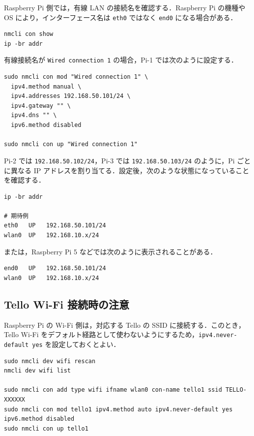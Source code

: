Raspberry Pi 側では，有線 LAN の接続名を確認する．Raspberry Pi の機種や OS により，インターフェース名は \texttt{eth0} ではなく \texttt{end0} になる場合がある．

\begin{lstlisting}
nmcli con show
ip -br addr
\end{lstlisting}

有線接続名が \texttt{Wired connection 1} の場合，Pi-1 では次のように設定する．

\begin{lstlisting}
sudo nmcli con mod "Wired connection 1" \
  ipv4.method manual \
  ipv4.addresses 192.168.50.101/24 \
  ipv4.gateway "" \
  ipv4.dns "" \
  ipv6.method disabled

sudo nmcli con up "Wired connection 1"
\end{lstlisting}

Pi-2 では \texttt{192.168.50.102/24}，Pi-3 では \texttt{192.168.50.103/24} のように，Pi ごとに異なる IP アドレスを割り当てる．設定後，次のような状態になっていることを確認する．

\begin{lstlisting}
ip -br addr

# 期待例
eth0   UP   192.168.50.101/24
wlan0  UP   192.168.10.x/24
\end{lstlisting}

または，Raspberry Pi 5 などでは次のように表示されることがある．

\begin{lstlisting}
end0   UP   192.168.50.101/24
wlan0  UP   192.168.10.x/24
\end{lstlisting}

\subsection{Tello Wi-Fi 接続時の注意}

Raspberry Pi の Wi-Fi 側は，対応する Tello の SSID に接続する．このとき，Tello Wi-Fi をデフォルト経路として使わないようにするため，\texttt{ipv4.never-default yes} を設定しておくとよい．

\begin{lstlisting}
sudo nmcli dev wifi rescan
nmcli dev wifi list

sudo nmcli con add type wifi ifname wlan0 con-name tello1 ssid TELLO-XXXXXX
sudo nmcli con mod tello1 ipv4.method auto ipv4.never-default yes ipv6.method disabled
sudo nmcli con up tello1
\end{lstlisting}

